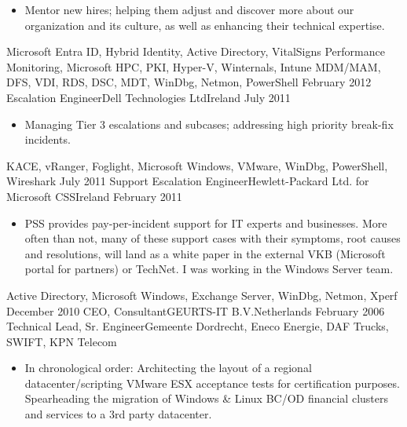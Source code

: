 \begin{experiences}
{\begin{itemize}
                        \item Mentor new hires; helping them adjust and discover more about our organization and its culture, as well as enhancing their technical expertise.
                      \end{itemize}
                    }
                    {Microsoft Entra ID, Hybrid Identity, Active Directory, VitalSigns Performance Monitoring, Microsoft HPC, PKI, Hyper-V, Winternals, Intune MDM/MAM, DFS, VDI, RDS, DSC, MDT, WinDbg, Netmon, PowerShell}
  \emptySeparator
  \experience
  {February 2012}   {Escalation Engineer}{Dell Technologies Ltd}{Ireland}
  {July 2011}       {
                      \begin{itemize}
                        \item Managing Tier 3 escalations and subcases; addressing high priority break-fix incidents.                            
                      \end{itemize}
                    }
                    {KACE, vRanger, Foglight, Microsoft Windows, VMware, WinDbg, PowerShell, Wireshark}
  \emptySeparator
  \experience
  {July 2011}       {Support Escalation Engineer}{Hewlett-Packard Ltd. for Microsoft CSS}{Ireland}
  {February 2011}   {                    
                      \begin{itemize}
                        \item PSS provides pay-per-incident support for IT experts and businesses. More often than not, many of these support cases with their symptoms, root causes and resolutions, will land as a white paper in the external VKB (Microsoft portal for partners) or TechNet. I was working in the Windows Server team.                                       
                      \end{itemize}
                    }
                    {Active Directory, Microsoft Windows, Exchange Server, WinDbg, Netmon, Xperf}
  \emptySeparator   
  \consultantexperience
  {December 2010}   {CEO, Consultant}{GEURTS-IT B.V.}{Netherlands}
  {February 2006}   {Technical Lead, Sr. Engineer}{Gemeente Dordrecht, Eneco Energie, DAF Trucks, SWIFT, KPN Telecom}
                    {
                      \begin{itemize}
                        \item In chronological order:
                        \newline Architecting the layout of a regional datacenter/scripting VMware ESX acceptance tests for certification purposes.
                        \linebreak Spearheading the migration of Windows \& Linux BC/OD financial clusters and services to a 3rd party datacenter.

\end{itemize}}
\end{experiences}
